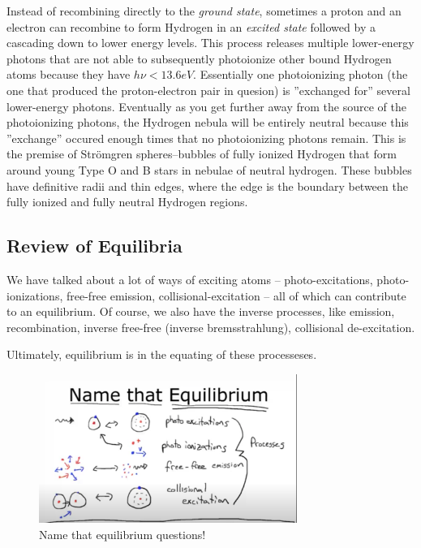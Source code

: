 \documentclass{article}
\begin{document}
Instead of recombining directly to the \emph{ground state}, sometimes a proton and an electron can recombine to form Hydrogen in an \emph{excited state} followed by a cascading down to lower energy levels. This process releases multiple lower-energy photons that are not able to subsequently photoionize other bound Hydrogen atoms because they have $h \nu < 13.6 eV$. Essentially one photoionizing photon (the one that produced the proton-electron pair in quesion) is ''exchanged for'' several lower-energy photons. Eventually as you get further away from the source of the photoionizing photons, the Hydrogen nebula will be entirely neutral because this ''exchange'' occured enough times that no photoionizing photons remain. This is the premise of Str\"{o}mgren spheres--bubbles of fully ionized Hydrogen that form around young Type O and B stars in nebulae of neutral hydrogen. These bubbles have definitive radii and thin edges, where the edge is the boundary between the fully ionized and fully neutral Hydrogen regions.

\subsection{Review of Equilibria}

We have talked about a lot of ways of exciting atoms -- photo-excitations, photo-ionizations, free-free emission, collisional-excitation -- all of which can contribute to an equilibrium. Of course, we also have the inverse processes, like emission, recombination, inverse free-free (inverse bremsstrahlung), collisional de-excitation. 

Ultimately, equilibrium is in the equating of these processeses.

\newcommand{\maxwellian}{\left(\frac{m}{2\pi k T}\right)^{3/2} 4 \pi v^2 e^{-\frac{m v^2}{2 k T}}}

\begin{figure}
    \centering
    \includegraphics[width=0.75\textwidth]{Screen Shot 2020-10-19 at 12.13.06 AM.png}
    \caption{Name that equilibrium questions!}
    \label{fig:equil}
\end{figure}
\end{document}
